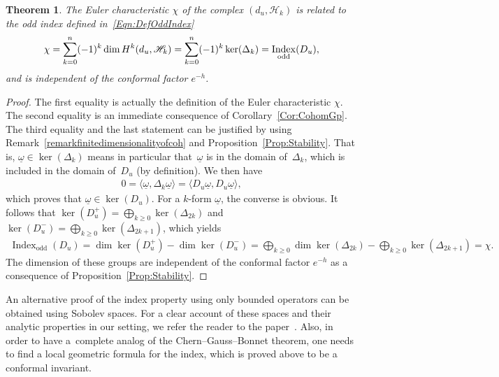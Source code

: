 \documentclass[pdftex]{sigma}
\newtheorem{Theorem}{Theorem}[section]
\newcommand{\Complex}[1][]{(d_{#1}, \Hh_k)}
\newcommand{\Hh}{\mathscr{H}}
\newcommand{\omegat}{\underline{\omega}}
\DeclareMathOperator{\ind}{Index}
\numberwithin{equation}{section}
\begin{document}
\begin{Theorem}
The Euler characteristic $\chi$ of the complex $\Complex[u]$ is related to the odd index defined in~\eqref{Eqn:DefOddIndex}
\begin{gather*}
\chi
 =
\sum_{k=0}^n (-1)^k \dim H^k \Complex[u]
 =
\sum_{k=0}^n (-1)^k \ker(\Delta_k )
 =
\ind_\textnormal{odd} (D_u),
\end{gather*}
and is independent of the conformal factor $e^{-h}$.
\end{Theorem}

\begin{proof}
The f\/irst equality is actually the def\/inition of the Euler characteristic $\chi$. The second equality is an immediate consequence of Corollary~\ref{Cor:CohomGp}. The third equality and the last statement can be justif\/ied by using Remark~\ref{remarkfinitedimensionalityofcoh}
and Proposition~\ref{Prop:Stability}. That is, $\omegat \in \ker(\Delta_k)$ means in particular that~$\omegat$ is in the domain of~$\Delta_k$, which is included in the domain of~$D_u$ (by def\/inition). We then have
\begin{gather*}
0 = \langle \omegat, \Delta_k \omegat \rangle = \langle D_u \omegat, D_u \omegat \rangle,
\end{gather*}
which proves that $\omegat \in \ker(D_u)$. For a $k$-form $\omegat$, the converse is obvious. It follows that $\ker(D_u^+) = \bigoplus_{k \geqslant 0} \ker(\Delta_{2 k})$ and $\ker(D_u^-) = \bigoplus_{k \geqslant 0} \ker(\Delta_{2 k+1})$, which yields
\begin{gather*}
\ind_\text{odd}(D_u) = \dim \ker(D_u^+) - \dim \ker(D_u^-)
= \bigoplus_{k \geqslant 0} \dim \ker(\Delta_{2 k}) - \bigoplus_{k \geqslant 0} \ker(\Delta_{2 k+1}) = \chi.
\end{gather*}
The dimension of these groups are independent of the conformal factor $e^{-h}$ as a consequence of Proposition~\ref{Prop:Stability}.
\end{proof}

\begin{Remark}
An alternative proof of the index property using only bounded operators can be obtained using Sobolev spaces. For a clear account of these spaces and their analytic properties in our setting, we refer the reader to the paper~\cite{TrSpLieGpWahl}.
Also, in order to have a~complete analog of the Chern--Gauss--Bonnet theorem, one needs to f\/ind a local geometric formula
for the index, which is proved above to be a conformal invariant.
\end{Remark}
\end{document}
